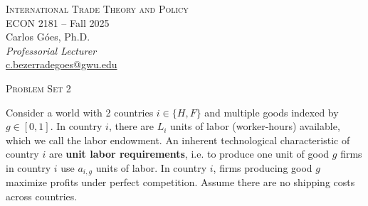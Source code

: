 \documentclass[11pt,letterpaper]{exam}
\begin{document}
\begin{center}
\Large{\textsc{International Trade Theory and Policy}}\\[4pt]
\Large{ECON 2181 \;--\; Fall 2025}\\[6pt]
\large Carlos Góes, Ph.D. \\
\textit{Professorial Lecturer}\\
\href{mailto:c.bezerradegoes@gwu.edu}{c.bezerradegoes@gwu.edu} \\
\end{center}

\bigskip

\begin{center}
\Large{\textsc{Problem Set 2}}
\end{center}


\begin{questions}

\question   Consider a world with 2 countries $i \in \{ H, F\}$ and multiple goods indexed by $g \in [0,1]$. In country $i$, there are $L_i$ units of labor (worker-hours) available, which we call the labor endowment. An inherent technological characteristic of country $i$ are \textbf{unit labor requirements}, i.e. to produce one unit of good $g$ firms in country $i$ use $a_{i,g}$ units of labor. In country $i$, firms producing good $g$ maximize profits under perfect competition. Assume there are no shipping costs across countries.

\end{questions}
\end{document}
